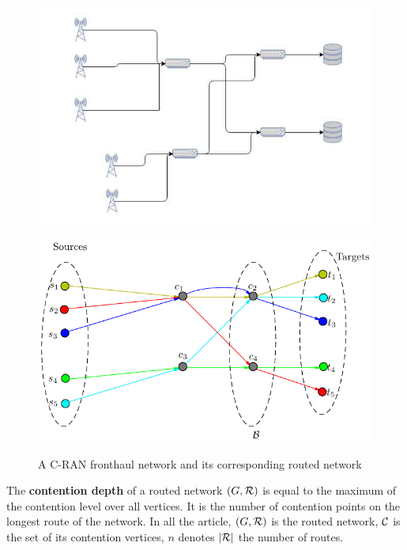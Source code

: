 \documentclass[10pt, conference, letterpaper]{IEEEtran}
\begin{document}
\begin{figure}

\begin{minipage}[c]{.45\linewidth}
	
	
	\includegraphics[scale=0.5]{fronthaul}



	 \end{minipage} 
 \hfill
 \begin{minipage}[c]{.45\linewidth}
	
	
	\includegraphics[scale=0.5]{graphmodel}\\

	 \end{minipage}
	 
\caption{A C-RAN fronthaul network and its corresponding routed network}
\label{fig:fronthaul}
\end{figure} 

	The  \textbf{contention depth} of a routed network $(G,{\cal R})$ is equal to the maximum of the contention level over all vertices. It is the number of contention points on the longest route of the network. In all the article, $(G,{\cal R})$ is the routed network, ${\cal C}$ is the set of its contention vertices, $n$ denotes $|\cal{R}|$ the number of routes.  
\end{document}
